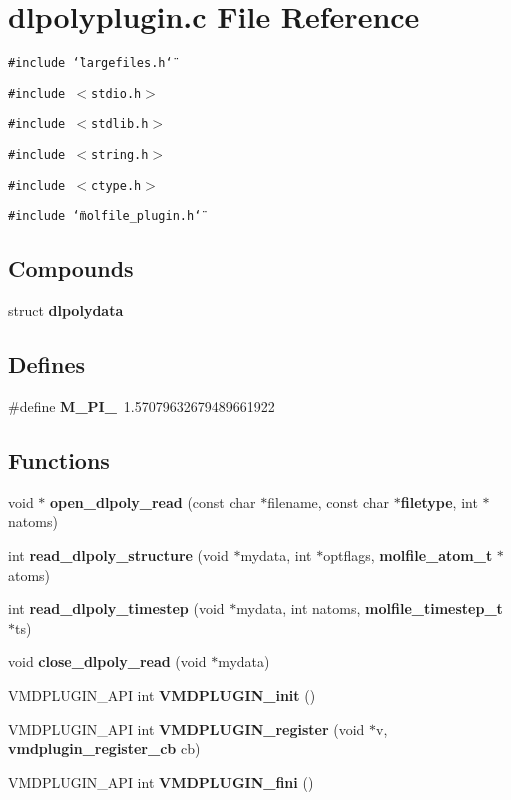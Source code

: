 \section{dlpolyplugin.c File Reference}
\label{dlpolyplugin_8c}
{\tt \#include \char`\"{}largefiles.h\char`\"{}}\par
{\tt \#include $<$stdio.h$>$}\par
{\tt \#include $<$stdlib.h$>$}\par
{\tt \#include $<$string.h$>$}\par
{\tt \#include $<$ctype.h$>$}\par
{\tt \#include \char`\"{}molfile\_\-plugin.h\char`\"{}}\par
\subsection*{Compounds}
\begin{CompactItemize}
\item 
struct {\bf dlpolydata}
\end{CompactItemize}
\subsection*{Defines}
\begin{CompactItemize}
\item 
\#define {\bf M\_\-PI\_}\ 1.57079632679489661922
\end{CompactItemize}
\subsection*{Functions}
\begin{CompactItemize}
\item 
void $\ast$ {\bf open\_\-dlpoly\_\-read} (const char $\ast$filename, const char $\ast${\bf filetype}, int $\ast$natoms)
\item 
int {\bf read\_\-dlpoly\_\-structure} (void $\ast$mydata, int $\ast$optflags, {\bf molfile\_\-atom\_\-t} $\ast$atoms)
\item 
int {\bf read\_\-dlpoly\_\-timestep} (void $\ast$mydata, int natoms, {\bf molfile\_\-timestep\_\-t} $\ast$ts)
\item 
void {\bf close\_\-dlpoly\_\-read} (void $\ast$mydata)
\item 
VMDPLUGIN\_\-API int {\bf VMDPLUGIN\_\-init} ()
\item 
VMDPLUGIN\_\-API int {\bf VMDPLUGIN\_\-register} (void $\ast$v, {\bf vmdplugin\_\-register\_\-cb} cb)
\item 
VMDPLUGIN\_\-API int {\bf VMDPLUGIN\_\-fini} ()
\end{CompactItemize}
